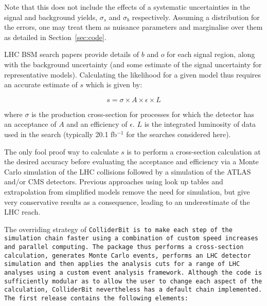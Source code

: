 Note that this does not include the effects of a systematic uncertainties in the signal and background yields, $\sigma_s$ and $\sigma_b$ respectively. Assuming a distribution for the errors, one may treat them as nuisance parameters and marginalise over them as detailed in Section~\ref{sec:code}.

LHC BSM search papers provide details of $b$ and $o$ for each signal region, along with the background uncertainty (and some estimate of the signal uncertainty for representative models). Calculating the likelihood for a given model thus requires an accurate estimate of $s$ which is given by:

\begin{equation}
\label{eq:s}
s=\sigma \times A \times \epsilon \times L
\end{equation}

where $\sigma$ is the production cross-section for processes for which the detector has an acceptance of $A$ and an efficiency of $\epsilon$. $L$ is the integrated luminosity of data used in the search (typically 20.1 fb$^{-1}$ for the searches considered here).

The only fool proof way to calculate $s$ is to perform a cross-section calculation at the desired accuracy before evaluating the acceptance and efficiency via a Monte Carlo simulation of the LHC collisions followed by a simulation of the ATLAS and/or CMS detectors. Previous approaches using look up tables and extrapolation from simplified models remove the need for simulation, but give very conservative results as a consequence, leading to an underestimate of the LHC reach.

The overriding strategy of \tt ColliderBit \rm is to make each step of the simulation chain faster using a combination of custom speed increases and parallel computing. The package thus performs a cross-section calculation, generates Monte Carlo events, performs an LHC detector simulation and then applies the analysis cuts for a range of LHC analyses using a custom event analysis framework. Although the code is sufficiently modular as to allow the user to change each aspect of the calculation, \tt ColliderBit \rm nevertheless has a default chain implemented. The first release contains the following elements:

